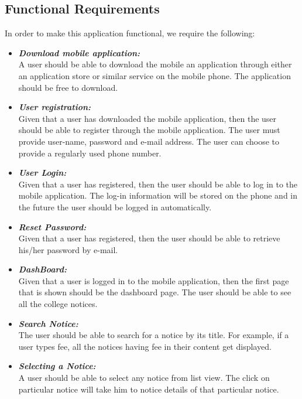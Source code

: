 \subsection{Functional Requirements}
In order to make this application functional, we require the following:
\begin{itemize}
\item \textbf{\emph{Download mobile application:}}\\
A user should be able to download the mobile an
application through either an application store or
similar service on the mobile phone. The application should be free to download.
\item \textbf{\emph{User registration:}}\\
Given that a user has downloaded the mobile application, then the user should be able to register
through the mobile application. The user must provide user-name, password and e-mail address. The user 
can choose to provide a regularly used phone number.

\item \textbf{\emph{User Login:}}\\
Given that a user has registered, then the user should be able to log in to the mobile application.
The log-in information will be stored on the phone and in the future the user should be logged in automatically. 

\item \textbf{\emph{Reset Password:}}\\
Given that a user has registered, then the user should be able to retrieve his/her password by e-mail. 

\item \textbf{\emph{DashBoard:}}\\
Given that a user is logged in to the mobile application, then the first page that is shown should be
the dashboard page. The user should be able to see all the college notices.

\item \textbf{\emph{Search Notice:}}\\
The user should be able to search for a notice by its title. For example, if a user types fee, all the notices having fee in their content get displayed.

\item \textbf{\emph{Selecting a Notice:}}\\
 A user should be able to select any notice from list view. The click on particular notice will take him to notice details
 of that particular notice.


\end{itemize}
